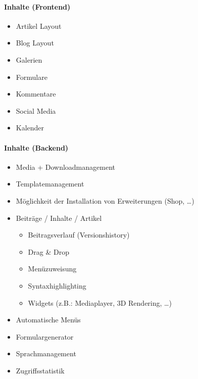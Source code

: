 	\paragraph{Inhalte (Frontend)}
		\begin{itemize}
			\item Artikel Layout
			\item Blog Layout
			\item Galerien
			\item Formulare
			\item Kommentare
			\item Social Media
			\item Kalender
		\end{itemize}
		
	\paragraph{Inhalte (Backend)}
		\begin{itemize}
			\item Media + Downloadmanagement
			\item Templatemanagement
			\item Möglichkeit der Installation von Erweiterungen (Shop, \ldots)
			\item Beiträge / Inhalte / Artikel
			\begin{itemize}
				\item Beitragsverlauf (Versionshistory)
				\item Drag \& Drop
				\item Menüzuweisung
				\item Syntaxhighlighting
				\item Widgets (z.B.: Mediaplayer, 3D Rendering, \ldots)
			\end{itemize}
			\item Automatische Menüs
			\item Formulargenerator
			\item Sprachmanagement
			\item Zugriffsstatistik
		\end{itemize}